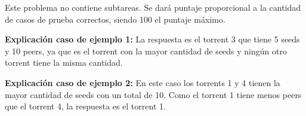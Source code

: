 \documentclass{oci}
\begin{document}
\begin{scoreDescription}
Este problema no contiene subtareas.
Se dará puntaje proporcional a la cantidad de casos de prueba correctos, siendo 100 el puntaje máximo.
\end{scoreDescription}

\begin{sampleDescription}
\begin{center}
    \begin{minipage}{0.95\textwidth}
    \textbf{Explicación caso de ejemplo 1:} La respuesta es el torrent 3 que tiene 5 seeds y 10 peers,
    ya que es el torrent con la mayor cantidad de seeds y ningún otro torrent tiene la misma cantidad.
    \end{minipage}
\end{center}
\begin{center}
    \begin{minipage}{0.95\textwidth}
    \textbf{Explicación caso de ejemplo 2:} En este caso los torrents 1 y 4 tienen la mayor cantidad
    de seeds con un total de 10.
    Como el torrent 1 tiene menos peers que el torrent 4, la respuesta es el torrent 1.
    \end{minipage}
\end{center}

\end{sampleDescription}
\end{document}
